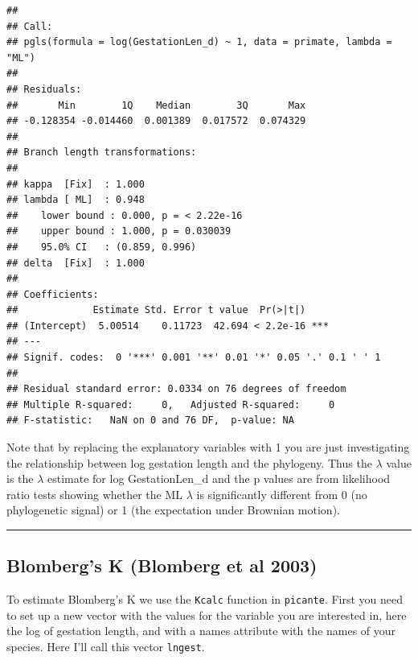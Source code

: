 \documentclass[]{book}
\newenvironment{Shaded}{\begin{snugshade}}{\end{snugshade}}
\newcommand{\KeywordTok}[1]{\textcolor[rgb]{0.13,0.29,0.53}{\textbf{{#1}}}}
\newcommand{\StringTok}[1]{\textcolor[rgb]{0.31,0.60,0.02}{{#1}}}
\newcommand{\NormalTok}[1]{{#1}}
\theoremstyle{definition}
\theoremstyle{definition}
\theoremstyle{definition}
\theoremstyle{remark}
\begin{document}
\begin{verbatim}
## 
## Call:
## pgls(formula = log(GestationLen_d) ~ 1, data = primate, lambda = "ML")
## 
## Residuals:
##       Min        1Q    Median        3Q       Max 
## -0.128354 -0.014460  0.001389  0.017572  0.074329 
## 
## Branch length transformations:
## 
## kappa  [Fix]  : 1.000
## lambda [ ML]  : 0.948
##    lower bound : 0.000, p = < 2.22e-16
##    upper bound : 1.000, p = 0.030039
##    95.0% CI   : (0.859, 0.996)
## delta  [Fix]  : 1.000
## 
## Coefficients:
##             Estimate Std. Error t value  Pr(>|t|)    
## (Intercept)  5.00514    0.11723  42.694 < 2.2e-16 ***
## ---
## Signif. codes:  0 '***' 0.001 '**' 0.01 '*' 0.05 '.' 0.1 ' ' 1
## 
## Residual standard error: 0.0334 on 76 degrees of freedom
## Multiple R-squared:     0,   Adjusted R-squared:     0 
## F-statistic:   NaN on 0 and 76 DF,  p-value: NA
\end{verbatim}

Note that by replacing the explanatory variables with 1 you are just
investigating the relationship between log gestation length and the
phylogeny. Thus the \(\lambda\) value is the \(\lambda\) estimate for
log GestationLen\_d and the p values are from likelihood ratio tests
showing whether the ML \(\lambda\) is significantly different from 0 (no
phylogenetic signal) or 1 (the expectation under Brownian motion).

\begin{center}\rule{0.5\linewidth}{\linethickness}\end{center}

\subsection{Blomberg's K (Blomberg et al
2003)}\label{blombergs-k-blomberg-et-al-2003}

To estimate Blomberg's K we use the \texttt{Kcalc} function in
\texttt{picante}. First you need to set up a new vector with the values
for the variable you are interested in, here the log of gestation
length, and with a names attribute with the names of your species. Here
I'll call this vector \texttt{lngest}.

\begin{Shaded}
\end{Shaded}
\end{document}
